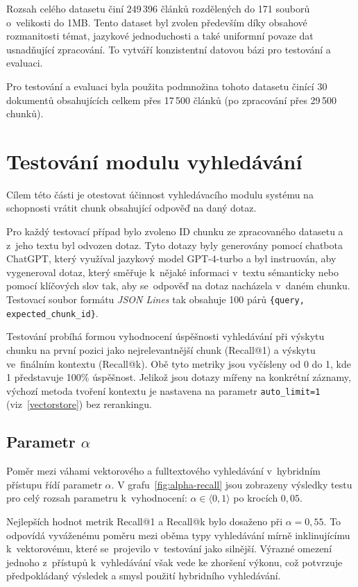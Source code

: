 Rozsah celého datasetu činí 249\,396 článků rozdělených do 171 souborů o~velikosti do 1MB. Tento dataset byl zvolen především díky obsahové rozmanitosti témat, jazykové jednoduchosti a také uniformní povaze dat usnadňující zpracování. To vytváří konzistentní datovou bázi pro testování a evaluaci.

Pro testování a evaluaci byla použita podmnožina tohoto datasetu činící 30 dokumentů obsahujících celkem přes 17\,500 článků (po zpracování přes 29\,500 chunků).

\section{Testování modulu vyhledávání}
Cílem této části je otestovat účinnost vyhledávacího modulu systému na schopnosti vrátit chunk obsahující odpověď na daný dotaz.

Pro každý testovací případ bylo zvoleno ID chunku ze zpracovaného datasetu a z~jeho textu byl odvozen dotaz. Tyto dotazy byly generovány pomocí chatbota ChatGPT, který využíval jazykový model GPT-4-turbo a byl instruován, aby vygeneroval dotaz, který směřuje k~nějaké informaci v~textu sémanticky nebo pomocí klíčových slov tak, aby se~odpověď na dotaz nacházela v~daném chunku. Testovací soubor formátu \textit{JSON Lines} tak obsahuje 100 párů \texttt{\{query, expected\_chunk\_id\}}.

Testování probíhá formou vyhodnocení úspěšnosti vyhledávání při výskytu chunku na první pozici jako nejrelevantnější chunk (Recall@1) a výskytu ve~finálním kontextu (Recall@k). Obě tyto metriky jsou vyčísleny od 0 do 1, kde 1 představuje 100\% úspěšnost. Jelikož jsou dotazy mířeny na konkrétní záznamy, výchozí metoda tvoření kontextu je nastavena na parametr \texttt{auto\_limit=1} (viz~\ref{vectorstore}) bez rerankingu.

\subsection{Parametr $\alpha$}
Poměr mezi váhami vektorového a fulltextového vyhledávání v~hybridním přístupu řídí parametr $\alpha$. V grafu~\ref{fig:alpha-recall} jsou zobrazeny výsledky testu pro celý rozsah parametru k~vyhodnocení: $\alpha \in \langle 0, 1 \rangle$ po krocích $0{,}05$.

Nejlepších hodnot metrik Recall@1 a Recall@k bylo dosaženo při $\alpha = 0{,}55$. To odpovídá vyváženému poměru mezi oběma typy vyhledávání mírně inklinujícímu k~vektorovému, které se~projevilo v~testování jako silnější. Výrazné omezení jednoho z~přístupů k~vyhledávání však vede ke zhoršení výkonu, což potvrzuje předpokládaný výsledek a smysl použití hybridního vyhledávání.

